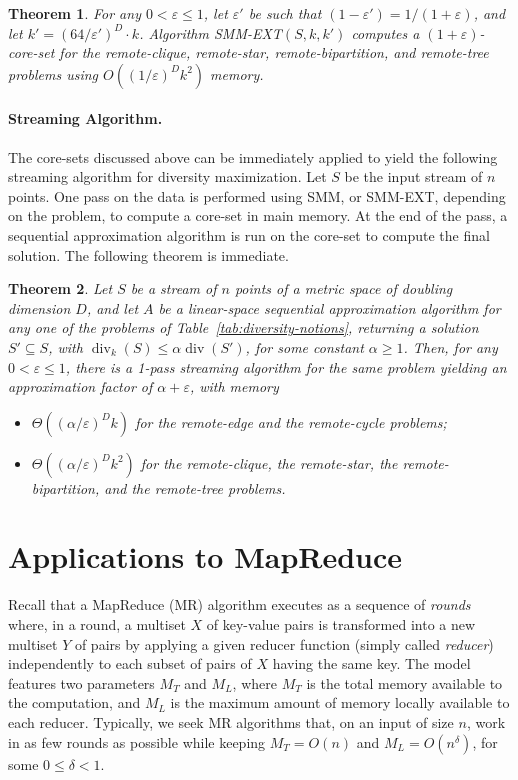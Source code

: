 \documentclass{article}
\newtheorem{theorem}{Theorem}
\DeclareMathOperator{\diversity}{div}
\renewcommand{\epsilon}{\varepsilon}
\newcommand{\BO}[1]{O\left( #1 \right)}
\newcommand{\BT}[1]{\Theta\left( #1 \right)}
\begin{document}
\begin{theorem}\label{thm:streaming-remote-clique}
For any $0 < \epsilon \leq 1$, let $\epsilon'$ be such that
$(1-\epsilon')=1/(1+\epsilon)$, and let $k'=(64/\epsilon')^D\cdot k$. 
  Algorithm {\sc SMM-EXT}$(S, k, k')$ computes a
  $(1+\epsilon)$-core-set for the remote-clique, remote-star,
  remote-bipartition, and remote-tree problems using
  $\BO{(1/\epsilon)^Dk^2}$ memory.
\end{theorem}
\paragraph{Streaming Algorithm.}  The core-sets discussed above
can be immediately applied to yield the following streaming algorithm
for diversity maximization.  Let $S$ be the input stream of $n$ points.
One pass on the data is performed using  {\sc SMM}, or
{\sc SMM-EXT}, depending on the problem, to compute a core-set 
in main memory. At the end of the pass, a sequential
approximation algorithm is run on the core-set to compute the final solution.
The following theorem is immediate.
\begin{theorem} \label{thm:streaming-1-pass} 
Let $S$ be a stream of $n$ points of
  a metric space of doubling dimension $D$, and let $A$ be a
  linear-space sequential approximation algorithm for any one of the
  problems of Table~\ref{tab:diversity-notions}, returning a solution
  $S'\subseteq S$, with $\diversity_k(S)\leq \alpha\diversity(S')$,
  for some constant $\alpha \geq 1$. Then, for any $0< \epsilon \le 1$,
  there is a 1-pass streaming algorithm for the same problem yielding an
  approximation factor of $\alpha+\epsilon$, with memory
  \begin{itemize}
  \item $\BT{(\alpha/\epsilon)^Dk}$ for the remote-edge
    and the remote-cycle problems;
  \item $\BT{(\alpha/\epsilon)^Dk^2}$ for the remote-clique,
    the remote-star, the remote-bipartition, and the remote-tree
    problems.
  \end{itemize}
\end{theorem}

\section{Applications to MapReduce}
\label{sec:mapreduce}

Recall that a MapReduce (MR) algorithm \cite{KarloffSV10,
  PietracaprinaPRSU12} executes as a sequence of \emph{rounds} where,
in a round, a multiset $X$ of key-value pairs is transformed into a
new multiset $Y$ of pairs by applying a given reducer function (simply
called \emph{reducer}) independently to each subset of pairs of $X$
having the same key. The model features two parameters $M_T$ and
$M_L$, where $M_T$ is the total memory available to the computation,
and $M_L$ is the maximum amount of memory locally available to each
reducer. Typically, we seek MR algorithms that, on an input of size
$n$, work in as few rounds as possible while keeping $M_T=\BO{n}$ and
$M_L=\BO{n^{\delta}}$, for some $0\le {\delta} < 1$.
 
\end{document}
